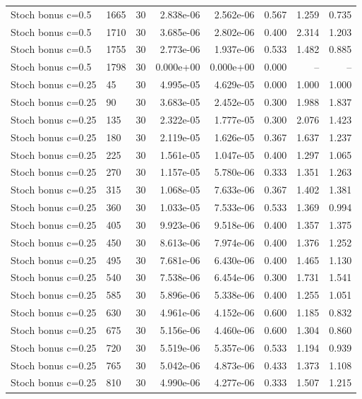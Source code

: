 \begin{scriptsize}
\begin{longtable}{llrrrrrr}
Stoch bonus c=0.5 & 1665 & 30 & 2.838e-06 & 2.562e-06 & 0.567 & 1.259 & 0.735 \\
Stoch bonus c=0.5 & 1710 & 30 & 3.685e-06 & 2.802e-06 & 0.400 & 2.314 & 1.203 \\
Stoch bonus c=0.5 & 1755 & 30 & 2.773e-06 & 1.937e-06 & 0.533 & 1.482 & 0.885 \\
Stoch bonus c=0.5 & 1798 & 30 & 0.000e+00 & 0.000e+00 & 0.000 & -- & -- \\
Stoch bonus c=0.25 & 45 & 30 & 4.995e-05 & 4.629e-05 & 0.000 & 1.000 & 1.000 \\
Stoch bonus c=0.25 & 90 & 30 & 3.683e-05 & 2.452e-05 & 0.300 & 1.988 & 1.837 \\
Stoch bonus c=0.25 & 135 & 30 & 2.322e-05 & 1.777e-05 & 0.300 & 2.076 & 1.423 \\
Stoch bonus c=0.25 & 180 & 30 & 2.119e-05 & 1.626e-05 & 0.367 & 1.637 & 1.237 \\
Stoch bonus c=0.25 & 225 & 30 & 1.561e-05 & 1.047e-05 & 0.400 & 1.297 & 1.065 \\
Stoch bonus c=0.25 & 270 & 30 & 1.157e-05 & 5.780e-06 & 0.333 & 1.351 & 1.263 \\
Stoch bonus c=0.25 & 315 & 30 & 1.068e-05 & 7.633e-06 & 0.367 & 1.402 & 1.381 \\
Stoch bonus c=0.25 & 360 & 30 & 1.033e-05 & 7.533e-06 & 0.533 & 1.369 & 0.994 \\
Stoch bonus c=0.25 & 405 & 30 & 9.923e-06 & 9.518e-06 & 0.400 & 1.357 & 1.375 \\
Stoch bonus c=0.25 & 450 & 30 & 8.613e-06 & 7.974e-06 & 0.400 & 1.376 & 1.252 \\
Stoch bonus c=0.25 & 495 & 30 & 7.681e-06 & 6.430e-06 & 0.400 & 1.465 & 1.130 \\
Stoch bonus c=0.25 & 540 & 30 & 7.538e-06 & 6.454e-06 & 0.300 & 1.731 & 1.541 \\
Stoch bonus c=0.25 & 585 & 30 & 5.896e-06 & 5.338e-06 & 0.400 & 1.255 & 1.051 \\
Stoch bonus c=0.25 & 630 & 30 & 4.961e-06 & 4.152e-06 & 0.600 & 1.185 & 0.832 \\
Stoch bonus c=0.25 & 675 & 30 & 5.156e-06 & 4.460e-06 & 0.600 & 1.304 & 0.860 \\
Stoch bonus c=0.25 & 720 & 30 & 5.519e-06 & 5.357e-06 & 0.533 & 1.194 & 0.939 \\
Stoch bonus c=0.25 & 765 & 30 & 5.042e-06 & 4.873e-06 & 0.433 & 1.373 & 1.108 \\
Stoch bonus c=0.25 & 810 & 30 & 4.990e-06 & 4.277e-06 & 0.333 & 1.507 & 1.215 \\

\end{longtable}
\end{scriptsize}
